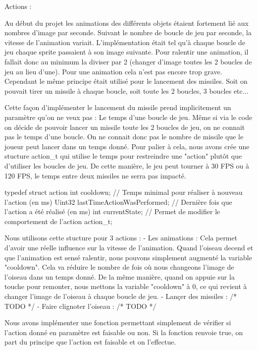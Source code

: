 Actions :

    Au début du projet les animations des différents objets étaient fortement lié aux nombres d'image par seconde. Suivant le nombre de boucle de jeu par seconde, 
la vitesse de l'animation variait. L'implémentation était tel qu'à chaque boucle de jeu chaque sprite passaient à son image suivante. Pour ralentir une animation, 
il fallait donc au minimum la diviser par 2 (changer d'image toutes les 2 boucles de jeu au lieu d'une). Pour une animation cela n'est pas encore trop grave. 
Cependant le même principe était utilisé pour le lancement des missiles. Soit on pouvait tirer un missile à chaque boucle, soit toute les 2 boucles, 3 boucles etc... 

    Cette façon d'implémenter le lancement du missile prend implicitement un paramètre qu'on ne veux pas : Le temps d'une boucle de jeu.
Même si via le code on décide de pouvoir lancer un missile toute les 2 boucles de jeu, on ne connait pas le temps d'une boucle. On ne connait donc pas le nombre de missile 
que le joueur peut lancer dans un temps donné. Pour palier à cela, nous avons crée une stucture action_t qui utilise le temps pour restreindre une "action" plutôt que d'utiliser 
les boucles de jeu. De cette manière, le jeu peut tourner à 30 FPS ou à 120 FPS, le temps entre deux missiles ne serra pas impacté.

typedef struct action {
    int cooldown; // Temps minimal pour réaliser à nouveau l'action (en ms)
    Uint32 lastTimeActionWasPerformed; // Dernière fois que l'action a été réalisé (en ms)
    int currentState; // Permet de modifier le comportement de l'action
} action_t;

    Nous utilisons cette stucture pour 3 actions : 
    - Les animations : Cela permet d'avoir une réelle influence sur la vitesse de l'animation. Quand l'oiseau decend et que l'animation est sensé ralentir, nous pouvons 
    simplement augmenté la variable "cooldown". Cela va réduire le nombre de fois où nous changeons l'image de l'oiseau dans un temps donné. De la même manière, quand on appuie sur
    la touche pour remonter, nous mettons la variable "cooldown" à 0, ce qui revient à changer l'image de l'oiseau à chaque boucle de jeu.
    - Lançer des missiles : /* TODO */
    - Faire clignoter l'oiseau : /* TODO */

    Nous avons implémenter une fonction permettant simplement de vérifier si l'action donné en paramètre est faisable ou non. Si la fonction renvoie true, on part du principe que l'action est
    faisable et on l'effectue.

